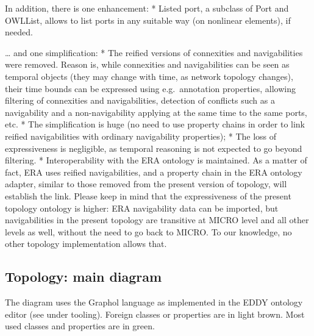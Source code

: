 \documentclass[
  11pt,
]{article}
\begin{document}
In addition, there is one enhancement: * Listed port, a subclass of Port
and OWLList, allows to list ports in any suitable way (on nonlinear
elements), if needed.

\ldots{} and one simplification: * The reified versions of connexities
and navigabilities were removed. Reason is, while connexities and
navigabilities can be seen as temporal objects (they may change with
time, as network topology changes), their time bounds can be expressed
using e.g.~annotation properties, allowing filtering of connexities and
navigabilities, detection of conflicts such as a navigability and a
non-navigability applying at the same time to the same ports, etc. * The
simplification is huge (no need to use property chains in order to link
reified navigabilities with ordinary navigability properties); * The
loss of expressiveness is negligible, as temporal reasoning is not
expected to go beyond filtering. * Interoperability with the ERA
ontology is maintained. As a matter of fact, ERA uses reified
navigabilities, and a property chain in the ERA ontology adapter,
similar to those removed from the present version of topology, will
establish the link. Please keep in mind that the expressiveness of the
present topology ontology is higher: ERA navigability data can be
imported, but navigabilities in the present topology are transitive at
MICRO level and all other levels as well, without the need to go back to
MICRO. To our knowledge, no other topology implementation allows that.

\hypertarget{topology-main-diagram}{%
\subsection{Topology: main diagram}\label{topology-main-diagram}}

The diagram uses the Graphol language as implemented in the EDDY
ontology editor (see under tooling). Foreign classes or properties are
in light brown. Most used classes and properties are in green.
\end{document}
